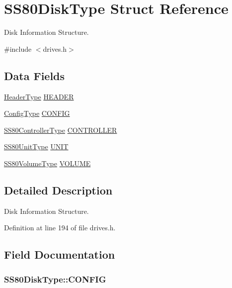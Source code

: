 \hypertarget{structSS80DiskType}{}\section{S\+S80\+Disk\+Type Struct Reference}
\label{structSS80DiskType}


Disk Information Structure.  




{\ttfamily \#include $<$drives.\+h$>$}

\subsection*{Data Fields}
\begin{DoxyCompactItemize}
\item 
\hyperlink{structHeaderType}{Header\+Type} \hyperlink{structSS80DiskType_ae66c0130dee8c362743dfdfc41539c3b}{H\+E\+A\+D\+ER}
\item 
\hyperlink{structConfigType}{Config\+Type} \hyperlink{structSS80DiskType_aeff2b9e1dcd95310e9e8dee63a60ed95}{C\+O\+N\+F\+IG}
\item 
\hyperlink{structSS80ControllerType}{S\+S80\+Controller\+Type} \hyperlink{structSS80DiskType_ae9da84cba5786cf755c388eba065c0cd}{C\+O\+N\+T\+R\+O\+L\+L\+ER}
\item 
\hyperlink{structSS80UnitType}{S\+S80\+Unit\+Type} \hyperlink{structSS80DiskType_ac630da1440afd60d726c7c41eb7b990c}{U\+N\+IT}
\item 
\hyperlink{structSS80VolumeType}{S\+S80\+Volume\+Type} \hyperlink{structSS80DiskType_adef69576dbc48a5d70ff628578d77b60}{V\+O\+L\+U\+ME}
\end{DoxyCompactItemize}


\subsection{Detailed Description}
Disk Information Structure. 

Definition at line 194 of file drives.\+h.



\subsection{Field Documentation}
\subsubsection[{\texorpdfstring{C\+O\+N\+F\+IG}{CONFIG}}]{ S\+S80\+Disk\+Type\+::\+C\+O\+N\+F\+IG}\hypertarget{structSS80DiskType_aeff2b9e1dcd95310e9e8dee63a60ed95}{}\label{structSS80DiskType_aeff2b9e1dcd95310e9e8dee63a60ed95}


